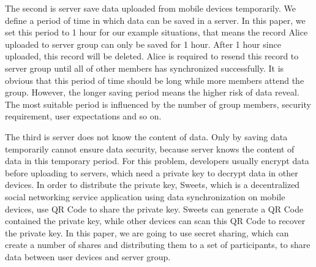 \documentclass[twocolumn,10pt]{article}
\begin{document}
The second is server save data uploaded from mobile devices temporarily. We define a period of time in which data can be saved in a server. In this paper, we set this period to 1 hour for our example situations, that means the record Alice uploaded to server group can only be saved for 1 hour. After 1 hour since uploaded, this record will be deleted. Alice is required to resend this record to server group until all of other members has synchronized successfully. It is obvious that this period of time should be long while more members attend the group. However, the longer saving period means the higher risk of data reveal. The most suitable period is influenced by the number of group members, security requirement, user expectations and so on. 

The third is server does not know the content of data. Only by saving data temporarily cannot ensure data security, because server knows the content of data in this temporary period. For this problem, developers usually encrypt data before uploading to servers, which need a private key to decrypt data in other devices. In order to distribute the private key, Sweets, which is a decentralized social networking service application using data synchronization on mobile devices, use QR Code to share the private key. Sweets can generate a QR Code contained the private key, while other devices can scan this QR Code to recover the private key. In this paper, we are going to use secret sharing, which can create a number of shares and distributing them to a set of participants\cite{smith2013layered}, to share data between user devices and server group.
\end{document}

